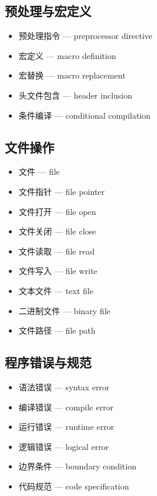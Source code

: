\subsection{预处理与宏定义}
\begin{itemize}
\item 预处理指令 — preprocessor directive
\item 宏定义 — macro definition
\item 宏替换 — macro replacement
\item 头文件包含 — header inclusion
\item 条件编译 — conditional compilation
\end{itemize}

\subsection{文件操作}
\begin{itemize}
\item 文件 — file
\item 文件指针 — file pointer
\item 文件打开 — file open
\item 文件关闭 — file close
\item 文件读取 — file read
\item 文件写入 — file write
\item 文本文件 — text file
\item 二进制文件 — binary file
\item 文件路径 — file path
\end{itemize}

\subsection{程序错误与规范}
\begin{itemize}
\item 语法错误 — syntax error
\item 编译错误 — compile error
\item 运行错误 — runtime error
\item 逻辑错误 — logical error
\item 边界条件 — boundary condition
\item 代码规范 — code specification
\end{itemize}
